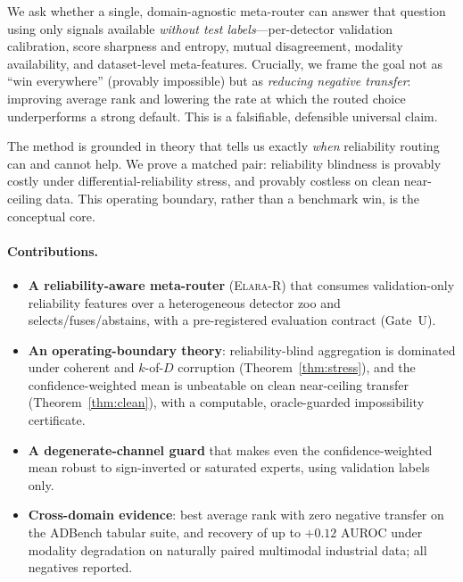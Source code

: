 \documentclass[11pt]{article}
\newcommand{\router}{\textsc{Elara-R}}
\begin{document}
We ask whether a single, domain-agnostic meta-router can answer that question using
only signals available \emph{without test labels}---per-detector validation
calibration, score sharpness and entropy, mutual disagreement, modality
availability, and dataset-level meta-features. Crucially, we frame the goal not as
``win everywhere'' (provably impossible) but as \emph{reducing negative transfer}:
improving average rank and lowering the rate at which the routed choice
underperforms a strong default. This is a falsifiable, defensible universal claim.

The method is grounded in theory that tells us exactly \emph{when} reliability
routing can and cannot help. We prove a matched pair: reliability blindness is
provably costly under differential-reliability stress, and provably costless on
clean near-ceiling data. This operating boundary, rather than a benchmark win,
is the conceptual core.

\paragraph{Contributions.}
\begin{itemize}\itemsep1pt
\item \textbf{A reliability-aware meta-router} (\router) that consumes
validation-only reliability features over a heterogeneous detector zoo and
selects/fuses/abstains, with a pre-registered evaluation contract (Gate~U).
\item \textbf{An operating-boundary theory}: reliability-blind aggregation is
dominated under coherent and $k$-of-$D$ corruption (Theorem~\ref{thm:stress}),
and the confidence-weighted mean is unbeatable on clean near-ceiling transfer
(Theorem~\ref{thm:clean}), with a computable, oracle-guarded impossibility
certificate.
\item \textbf{A degenerate-channel guard} that makes even the confidence-weighted
mean robust to sign-inverted or saturated experts, using validation labels only.
\item \textbf{Cross-domain evidence}: best average rank with zero negative transfer
on the ADBench tabular suite, and recovery of up to $+0.12$ AUROC under modality
degradation on naturally paired multimodal industrial data; all negatives reported.
\end{itemize}
\end{document}
